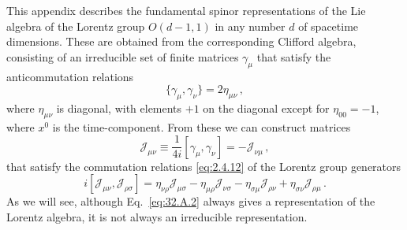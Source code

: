 

This appendix describes the fundamental spinor representations of the Lie
algebra of the Lorentz group \(O(d-1,1)\) in any number \(d\) of spacetime
dimensions. These are obtained from the corresponding Clifford algebra,
consisting of an irreducible set of finite matrices \(\gamma_\mu\) that
satisfy the anticommutation relations
\begin{equation}
  \{\gamma_\mu,\gamma_\nu\}=2\eta_{\mu\nu}\,,
  \tag{32.A.1}\label{eq:32.A.1}
\end{equation}
where \(\eta_{\mu\nu}\) is diagonal, with elements \(+1\) on the diagonal
except for \(\eta_{00}=-1\), where \(x^0\) is the time-component. From these
we can construct matrices
\begin{equation}
  \mathcal J_{\mu\nu}
  \equiv\frac{1}{4i}[\gamma_\mu,\gamma_\nu]
  =-\mathcal J_{\nu\mu}\,,
  \tag{32.A.2}\label{eq:32.A.2}
\end{equation}
that satisfy the commutation relations \eqref{eq:2.4.12} of the Lorentz
group generators
\begin{equation}
  i[\mathcal J_{\mu\nu},\mathcal J_{\rho\sigma}]
  =\eta_{\nu\rho}\mathcal J_{\mu\sigma}
   -\eta_{\mu\rho}\mathcal J_{\nu\sigma}
   -\eta_{\sigma\mu}\mathcal J_{\rho\nu}
   +\eta_{\sigma\nu}\mathcal J_{\rho\mu}\,.
  \tag{32.A.3}\label{eq:32.A.3}
\end{equation}
As we will see, although Eq.~\eqref{eq:32.A.2} always gives a representation
of the Lorentz algebra, it is not always an irreducible representation.

